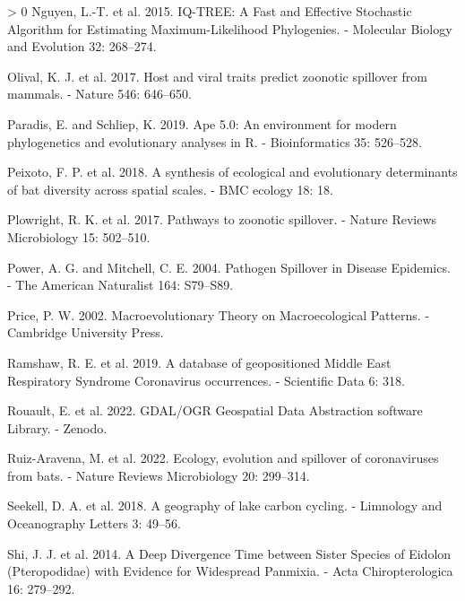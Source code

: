 \documentclass[11pt]{article}
\newlength{\cslhangindent}
\newenvironment{CSLReferences}[3] %
 {%
  \setlength{\parindent}{0pt}
  \ifodd #1 \everypar{\setlength{\hangindent}{\cslhangindent}}\ignorespaces\fi
  \ifnum #2 > 0
  \setlength{\parskip}{#2\baselineskip}
  \fi
 }%
 {}
\begin{document}
\begin{CSLReferences}{1}{0}
\leavevmode\hypertarget{ref-Nguyen2015IqtFas}{}%
Nguyen, L.-T. et al. 2015. IQ-TREE: A Fast and Effective Stochastic
Algorithm for Estimating Maximum-Likelihood Phylogenies. - Molecular
Biology and Evolution 32: 268--274.

\leavevmode\hypertarget{ref-Olival2017HosVir}{}%
Olival, K. J. et al. 2017. Host and viral traits predict zoonotic
spillover from mammals. - Nature 546: 646--650.

\leavevmode\hypertarget{ref-Paradis2019ApeEnv}{}%
Paradis, E. and Schliep, K. 2019. Ape 5.0: An environment for modern
phylogenetics and evolutionary analyses in R. - Bioinformatics 35:
526--528.

\leavevmode\hypertarget{ref-Peixoto2018SynEco}{}%
Peixoto, F. P. et al. 2018. A synthesis of ecological and evolutionary
determinants of bat diversity across spatial scales. - BMC ecology 18:
18.

\leavevmode\hypertarget{ref-Plowright2017PatZoo}{}%
Plowright, R. K. et al. 2017. Pathways to zoonotic spillover. - Nature
Reviews Microbiology 15: 502--510.

\leavevmode\hypertarget{ref-Power2004PatSpi}{}%
Power, A. G. and Mitchell, C. E. 2004. Pathogen Spillover in Disease
Epidemics. - The American Naturalist 164: S79--S89.

\leavevmode\hypertarget{ref-Price2002MacThe}{}%
Price, P. W. 2002. Macroevolutionary Theory on Macroecological Patterns.
- Cambridge University Press.

\leavevmode\hypertarget{ref-Ramshaw2019DatGeo}{}%
Ramshaw, R. E. et al. 2019. A database of geopositioned Middle East
Respiratory Syndrome Coronavirus occurrences. - Scientific Data 6: 318.

\leavevmode\hypertarget{ref-RouaultEven2022GdaOgr}{}%
Rouault, E. et al. 2022. GDAL/OGR Geospatial Data Abstraction software
Library. - Zenodo.

\leavevmode\hypertarget{ref-Ruiz-Aravena2022EcoEvo}{}%
Ruiz-Aravena, M. et al. 2022. Ecology, evolution and spillover of
coronaviruses from bats. - Nature Reviews Microbiology 20: 299--314.

\leavevmode\hypertarget{ref-Seekell2018GeoLak}{}%
Seekell, D. A. et al. 2018. A geography of lake carbon cycling. -
Limnology and Oceanography Letters 3: 49--56.

\leavevmode\hypertarget{ref-Shi2014DeeDiv}{}%
Shi, J. J. et al. 2014. A Deep Divergence Time between Sister Species of
Eidolon (Pteropodidae) with Evidence for Widespread Panmixia. - Acta
Chiropterologica 16: 279--292.


\end{CSLReferences}
\end{document}
